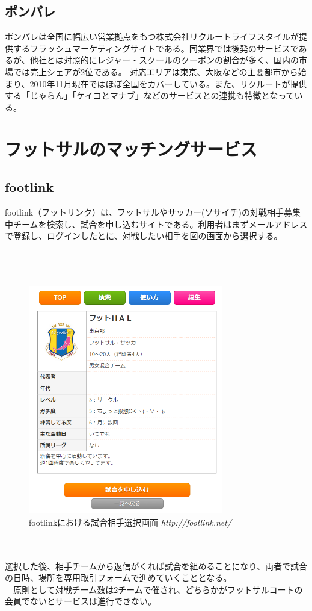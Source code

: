 \subsection{ポンパレ}
ポンパレは全国に幅広い営業拠点をもつ株式会社リクルートライフスタイルが提供するフラッシュマーケティングサイトである。同業界では後発のサービスであるが、他社とは対照的にレジャー・スクールのクーポンの割合が多く、国内の市場では売上シェアが2位である。
対応エリアは東京、大阪などの主要都市から始まり、2010年11月現在ではほぼ全国をカバーしている。また、リクルートが提供する「じゃらん」「ケイコとマナブ」などのサービスとの連携も特徴となっている。

\section{フットサルのマッチングサービス}
\subsection{footlink}
footlink（フットリンク）は、フットサルやサッカー(ソサイチ)の対戦相手募集中チームを検索し、試合を申し込むサイトである。利用者はまずメールアドレスで登録し、ログインしたとに、対戦したい相手を図の画面から選択する。
\\
\\
\\
\\
\begin{figure}[htbp]
	\centering
	\includegraphics[width=85mm, bb=0 0 800 272]{figures/fl.jpg}
	\caption{footlinkにおける試合相手選択画面 {\itshape http://footlink.net/}}
	\label{footlinkにおける試合相手選択画面}
\end{figure}
\\
\\
選択した後、相手チームから返信がくれば試合を組めることになり、両者で試合の日時、場所を専用取引フォームで進めていくこととなる。
\\　原則として対戦チーム数は2チームで催され、どちらかがフットサルコートの会員でないとサービスは進行できない。

